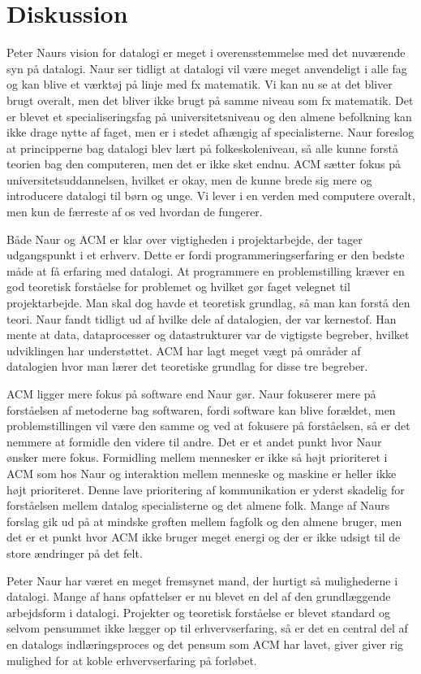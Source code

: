 \section{Diskussion}
Peter Naurs vision for datalogi er meget i overensstemmelse med det nuværende syn på datalogi. Naur ser tidligt at datalogi vil være meget anvendeligt i alle fag og kan blive et værktøj på linje med fx matematik. Vi kan nu se at det bliver brugt overalt, men det bliver ikke brugt på samme niveau som fx matematik. Det er blevet et specialiseringsfag på universitetsniveau og den almene befolkning kan ikke drage nytte af faget, men er i stedet afhængig af specialisterne. Naur foreslog at principperne bag datalogi blev lært på folkeskoleniveau, så alle kunne forstå teorien bag den computeren, men det er ikke sket endnu. ACM sætter fokus på universitetsuddannelsen, hvilket er okay, men de kunne brede sig mere og introducere datalogi til børn og unge. Vi lever i en verden med computere overalt, men kun de færreste af os ved hvordan de fungerer.

Både Naur og ACM er klar over vigtigheden i projektarbejde, der tager udgangspunkt i et erhverv. Dette er fordi programmeringserfaring er den bedste måde at få erfaring med datalogi. At programmere en problemstilling kræver en god teoretisk forståelse for problemet og hvilket gør faget velegnet til projektarbejde. Man skal dog havde et teoretisk grundlag, så man kan forstå den teori. Naur fandt tidligt ud af hvilke dele af datalogien, der var kernestof. Han mente at data, dataprocesser og datastrukturer var de vigtigste begreber, hvilket udviklingen har understøttet. ACM har lagt meget vægt på områder af datalogien hvor man lærer det teoretiske grundlag for disse tre begreber.

ACM ligger mere fokus på software end Naur gør. Naur fokuserer mere på forståelsen af metoderne bag softwaren, fordi software kan blive forældet, men problemstillingen vil være den samme og ved at fokusere på forståelsen, så er det nemmere at formidle den videre til andre. Det er et andet punkt hvor Naur ønsker mere fokus. Formidling mellem mennesker er ikke så højt prioriteret i ACM som hos Naur og interaktion mellem menneske og maskine er heller ikke højt prioriteret. Denne lave prioritering af kommunikation er yderst skadelig for forståelsen mellem datalog specialisterne og det almene folk. Mange af Naurs forslag gik ud på at mindske grøften mellem fagfolk og den almene bruger, men det er et punkt hvor ACM ikke bruger meget energi og der er ikke udsigt til de store ændringer på det felt.

Peter Naur har været en meget fremsynet mand, der hurtigt så mulighederne i datalogi. Mange af hans opfattelser er nu blevet en del af den grundlæggende arbejdsform i datalogi. Projekter og teoretisk forståelse er blevet standard og selvom pensummet ikke lægger op til erhvervserfaring, så er det en central del af en datalogs indlæringsproces og det pensum som ACM har lavet, giver giver rig mulighed for at koble erhvervserfaring på forløbet.